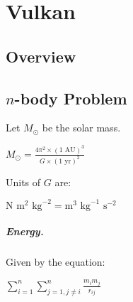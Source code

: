 \chapter{Vulkan}

\section{Overview}

\section{$n$-body Problem}

Let $M_{\odot}$ be the solar mass.

$M_{\odot} = \frac{4\pi^2 \times (1 \text{ AU})^3}{G \times (1 \text{ yr})^2}$

\noindent Units of $G$ are:

$\text{N} \text{ m}^2 \text{ kg}^{-2}
  = \text{m}^3 \text{ kg}^{-1} \text{ s}^{-2}$

\paragraph{Energy.}

Given by the equation:  

$\sum\limits_{i=1}^n \sum\limits_{j=1, j \neq i}^n \frac{m_i m_j}{r_{ij}}$
